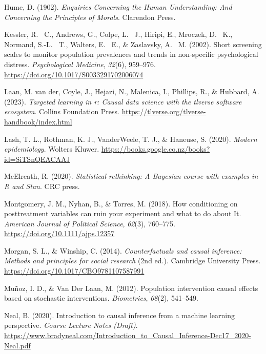\documentclass[
  single column]{article}
\newlength{\cslhangindent}
\newenvironment{CSLReferences}[2] %
 {\begin{list}{}{%
  \setlength{\itemindent}{0pt}
  \setlength{\leftmargin}{0pt}
  \setlength{\parsep}{0pt}
  \ifodd #1
   \setlength{\leftmargin}{\cslhangindent}
   \setlength{\itemindent}{-1\cslhangindent}
  \fi
  \setlength{\itemsep}{#2\baselineskip}}}
 {\end{list}}
\begin{document}
\begin{CSLReferences}{1}{0}
Hume, D. (1902). \emph{Enquiries Concerning the Human Understanding: And
Concerning the Principles of Morals}. Clarendon Press.

Kessler, R. ~C., Andrews, G., Colpe, L. ~J., Hiripi, E., Mroczek, D.
~K., Normand, S.-L. ~T., Walters, E. ~E., \& Zaslavsky, A. ~M. (2002).
Short screening scales to monitor population prevalences and trends in
non-specific psychological distress. \emph{Psychological Medicine},
\emph{32}(6), 959--976. \url{https://doi.org/10.1017/S0033291702006074}

Laan, M. van der, Coyle, J., Hejazi, N., Malenica, I., Phillips, R., \&
Hubbard, A. (2023). \emph{Targeted learning in r: Causal data science
with the tlverse software ecosystem}. Collins Foundation Press.
\url{https://tlverse.org/tlverse-handbook/index.html}

Lash, T. L., Rothman, K. J., VanderWeele, T. J., \& Haneuse, S. (2020).
\emph{Modern epidemiology}. Wolters Kluwer.
\url{https://books.google.co.nz/books?id=SiTSnQEACAAJ}

McElreath, R. (2020). \emph{Statistical rethinking: A {B}ayesian course
with examples in {R} and {S}tan}. CRC press.

Montgomery, J. M., Nyhan, B., \& Torres, M. (2018). How conditioning on
posttreatment variables can ruin your experiment and what to do about
It. \emph{American Journal of Political Science}, \emph{62}(3),
760--775. \url{https://doi.org/10.1111/ajps.12357}

Morgan, S. L., \& Winship, C. (2014). \emph{Counterfactuals and causal
inference: Methods and principles for social research} (2nd ed.).
Cambridge University Press.
\url{https://doi.org/10.1017/CBO9781107587991}

Muñoz, I. D., \& Van Der Laan, M. (2012). Population intervention causal
effects based on stochastic interventions. \emph{Biometrics},
\emph{68}(2), 541--549.

Neal, B. (2020). Introduction to causal inference from a machine
learning perspective. \emph{Course Lecture Notes (Draft)}.
\url{https://www.bradyneal.com/Introduction_to_Causal_Inference-Dec17_2020-Neal.pdf}


\end{CSLReferences}
\end{document}
